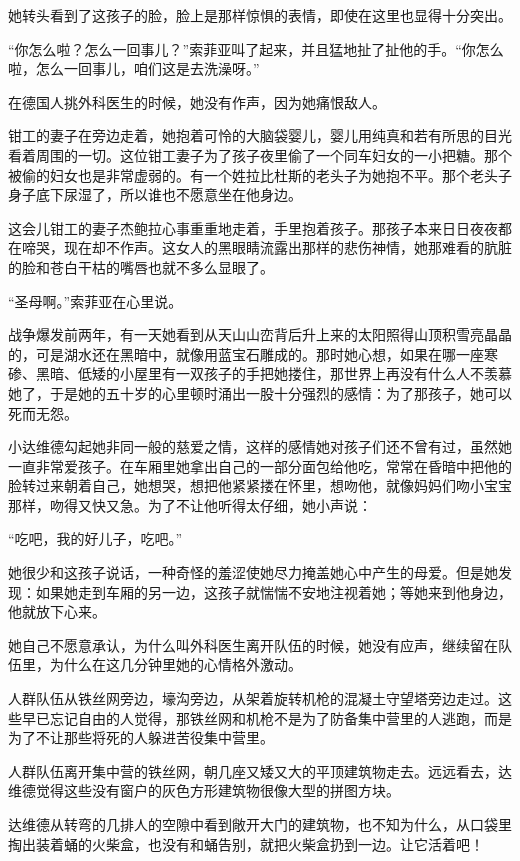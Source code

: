 她转头看到了这孩子的脸，脸上是那样惊惧的表情，即使在这里也显得十分突出。

“你怎么啦？怎么一回事儿？”索菲亚叫了起来，并且猛地扯了扯他的手。“你怎么啦，怎么一回事儿，咱们这是去洗澡呀。”

在德国人挑外科医生的时候，她没有作声，因为她痛恨敌人。

钳工的妻子在旁边走着，她抱着可怜的大脑袋婴儿，婴儿用纯真和若有所思的目光看着周围的一切。这位钳工妻子为了孩子夜里偷了一个同车妇女的一小把糖。那个被偷的妇女也是非常虚弱的。有一个姓拉比杜斯的老头子为她抱不平。那个老头子身子底下尿湿了，所以谁也不愿意坐在他身边。

这会儿钳工的妻子杰鲍拉心事重重地走着，手里抱着孩子。那孩子本来日日夜夜都在啼哭，现在却不作声。这女人的黑眼睛流露出那样的悲伤神情，她那难看的肮脏的脸和苍白干枯的嘴唇也就不多么显眼了。

“圣母啊。”索菲亚在心里说。

战争爆发前两年，有一天她看到从天山山峦背后升上来的太阳照得山顶积雪亮晶晶的，可是湖水还在黑暗中，就像用蓝宝石雕成的。那时她心想，如果在哪一座寒碜、黑暗、低矮的小屋里有一双孩子的手把她搂住，那世界上再没有什么人不羡慕她了，于是她的五十岁的心里顿时涌出一股十分强烈的感情：为了那孩子，她可以死而无怨。

小达维德勾起她非同一般的慈爱之情，这样的感情她对孩子们还不曾有过，虽然她一直非常爱孩子。在车厢里她拿出自己的一部分面包给他吃，常常在昏暗中把他的脸转过来朝着自己，她想哭，想把他紧紧搂在怀里，想吻他，就像妈妈们吻小宝宝那样，吻得又快又急。为了不让他听得太仔细，她小声说：

“吃吧，我的好儿子，吃吧。”

她很少和这孩子说话，一种奇怪的羞涩使她尽力掩盖她心中产生的母爱。但是她发现：如果她走到车厢的另一边，这孩子就惴惴不安地注视着她；等她来到他身边，他就放下心来。

她自己不愿意承认，为什么叫外科医生离开队伍的时候，她没有应声，继续留在队伍里，为什么在这几分钟里她的心情格外激动。

人群队伍从铁丝网旁边，壕沟旁边，从架着旋转机枪的混凝土守望塔旁边走过。这些早已忘记自由的人觉得，那铁丝网和机枪不是为了防备集中营里的人逃跑，而是为了不让那些将死的人躲进苦役集中营里。

人群队伍离开集中营的铁丝网，朝几座又矮又大的平顶建筑物走去。远远看去，达维德觉得这些没有窗户的灰色方形建筑物很像大型的拼图方块。

达维德从转弯的几排人的空隙中看到敞开大门的建筑物，也不知为什么，从口袋里掏出装着蛹的火柴盒，也没有和蛹告别，就把火柴盒扔到一边。让它活着吧！

